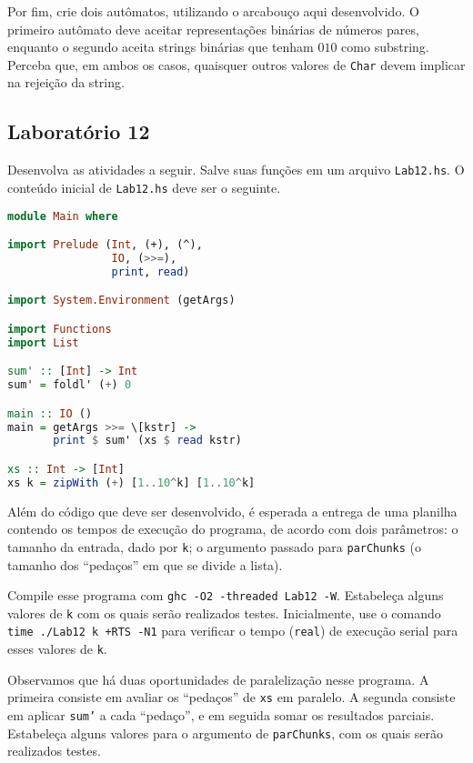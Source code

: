 \documentclass[a4paper]{article}
\begin{document}
Por fim, crie dois autômatos, utilizando o arcabouço aqui desenvolvido.
O primeiro autômato deve aceitar representações binárias de números pares,
enquanto o segundo aceita strings binárias que tenham $010$ como substring.
Perceba que, em ambos os casos, quaisquer outros valores de \texttt{Char} devem implicar na rejeição
da string.

\subsection{Laboratório 12}

Desenvolva as atividades a seguir.
Salve suas funções em um arquivo \texttt{Lab12.hs}.
O conteúdo inicial de \texttt{Lab12.hs} deve ser o seguinte.

\pagebreak

\begin{lstlisting}[language=haskell, frame=single]
module Main where

import Prelude (Int, (+), (^),
                IO, (>>=),
                print, read)

import System.Environment (getArgs)

import Functions
import List

sum' :: [Int] -> Int
sum' = foldl' (+) 0

main :: IO ()
main = getArgs >>= \[kstr] ->
       print $ sum' (xs $ read kstr)

xs :: Int -> [Int]
xs k = zipWith (+) [1..10^k] [1..10^k]
\end{lstlisting}

Além do código que deve ser desenvolvido, é esperada a entrega de uma planilha
contendo os tempos de execução do programa, de acordo com dois parâmetros:
o tamanho da entrada, dado por \texttt{k};
o argumento passado para \texttt{parChunks} (o tamanho dos ``pedaços'' em que se
divide a lista).

Compile esse programa com \texttt{ghc -O2 -threaded Lab12 -W}.
Estabeleça alguns valores de \texttt{k} com os quais serão realizados testes.
Inicialmente, use o comando \mbox{\texttt{time ./Lab12 k +RTS -N1}} para verificar o tempo (\texttt{real}) de execução serial para
esses valores de \texttt{k}.

Observamos que há duas oportunidades de paralelização nesse programa.
A primeira consiste em avaliar os ``pedaços'' de \texttt{xs} em paralelo.
A segunda consiste em aplicar \texttt{sum'} a cada ``pedaço'', e em seguida
somar os resultados parciais.
Estabeleça alguns valores para o argumento de \texttt{parChunks}, com os quais
serão realizados testes.
\end{document}
